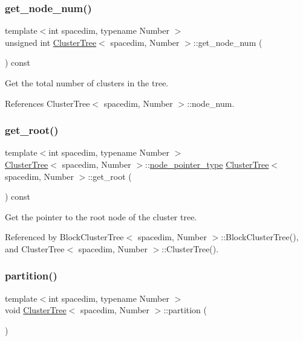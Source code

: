 \subsubsection{\texorpdfstring{get\+\_\+node\+\_\+num()}{get\_node\_num()}}
{\footnotesize\ttfamily template$<$int spacedim, typename Number $>$ \\
unsigned int \hyperlink{classClusterTree}{Cluster\+Tree}$<$ spacedim, Number $>$\+::get\+\_\+node\+\_\+num (\begin{DoxyParamCaption}{ }\end{DoxyParamCaption}) const}

Get the total number of clusters in the tree. 

References Cluster\+Tree$<$ spacedim, Number $>$\+::node\+\_\+num.

\mbox{\label{classClusterTree_a13132bfc3ca8b70af8c80066565b0adb}} 
\subsubsection{\texorpdfstring{get\+\_\+root()}{get\_root()}}
{\footnotesize\ttfamily template$<$int spacedim, typename Number $>$ \\
\hyperlink{classClusterTree}{Cluster\+Tree}$<$ spacedim, Number $>$\+::\hyperlink{classClusterTree_ae4bb0fdc7ac559d7844d04a00ab3e9de}{node\+\_\+pointer\+\_\+type} \hyperlink{classClusterTree}{Cluster\+Tree}$<$ spacedim, Number $>$\+::get\+\_\+root (\begin{DoxyParamCaption}{ }\end{DoxyParamCaption}) const}

Get the pointer to the root node of the cluster tree. 

Referenced by Block\+Cluster\+Tree$<$ spacedim, Number $>$\+::\+Block\+Cluster\+Tree(), and Cluster\+Tree$<$ spacedim, Number $>$\+::\+Cluster\+Tree().

\mbox{\label{classClusterTree_aa514c3b75864d5f7be72315a30079cfe}} 
\subsubsection{\texorpdfstring{partition()}{partition()}\hspace{0.1cm}{\footnotesize\ttfamily [1/3]}}
{\footnotesize\ttfamily template$<$int spacedim, typename Number $>$ \\
void \hyperlink{classClusterTree}{Cluster\+Tree}$<$ spacedim, Number $>$\+::partition (\begin{DoxyParamCaption}{ }\end{DoxyParamCaption})}

